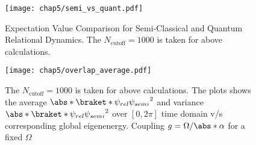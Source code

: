 \begin{figure}[!h]
        \centering
        \texttt{[image: chap5/semi\_vs\_quant.pdf]}
        \caption[Expectation Value Comparison for Semi-Classical and
         Quantum Relational Dynamics]{Expectation Value Comparison 
         for Semi-Classical and Quantum Relational Dynamics. The $N_{\mathrm{cutoff}}=1000$ is taken for above calculations.}
        \label{fig:chap5_JCM_schematic}
\end{figure}
\begin{figure}[!h]
        \centering
        \texttt{[image: chap5/overlap\_average.pdf]}
        \caption[Average $\abs*{\braket*{\psi_{rel}}{\psi_{semi}}}^2$ 
        (\& variance $\abs*{\braket*{\psi_{rel}}{\psi_{semi}}}^2$)
         v/s Global Eigen Energy]{The $N_{\mathrm{cutoff}}=1000$ is taken for above calculations.
         The plots shows the average $\abs*{\braket*{\psi_{rel}}{\psi_{semi}}}^2$ and 
         variance $\abs*{\braket*{\psi_{rel}}{\psi_{semi}}}^2$ over \([0, 2\pi]\) time domain v/s corresponding global eigenenergy.
         Coupling \(g = \Omega / \abs*{\alpha}\) for a fixed \(\Omega\)}
        \label{fig:chap5_JCM_schematic_2}
\end{figure}

